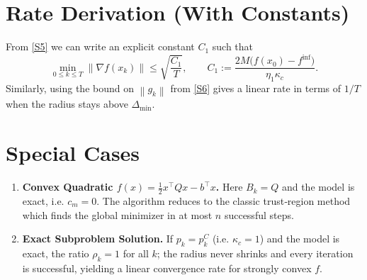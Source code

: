 \documentclass{article}
\newcommand{\norm}[1]{\left\lVert #1\right\rVert}
\begin{document}
\section*{Rate Derivation (With Constants)}
From \eqref{S5} we can write an explicit constant $C_{1}$ such that
\[
\min_{0\le k\le T}\norm{\nabla f(x_{k})}
\le \sqrt{\frac{C_{1}}{T}},\qquad
C_{1}:=\frac{2M\bigl(f(x_{0})-f^{\inf}\bigr)}{\eta_{1}\kappa_{\!c}}.
\]
Similarly, using the bound on $\norm{g_{k}}$ from \eqref{S6} gives a linear rate in terms of $1/T$ when the radius stays above $\Delta_{\min}$.

\section*{Special Cases}
\begin{enumerate}[label=\alph*)]
\item \textbf{Convex Quadratic $f(x)=\tfrac12 x^{\top}Qx-b^{\top}x$.}  
    Here $B_{k}=Q$ and the model is exact, i.e. $c_{m}=0$. The algorithm reduces to the classic trust‑region method which finds the global minimizer in at most $n$ successful steps.
\item \textbf{Exact Subproblem Solution.}  
    If $p_{k}=p^{C}_{k}$ (i.e. $\kappa_{\!c}=1$) and the model is exact, the ratio $\rho_{k}=1$ for all $k$; the radius never shrinks and every iteration is successful, yielding a linear convergence rate for strongly convex $f$.
\end{enumerate}
\end{document}
